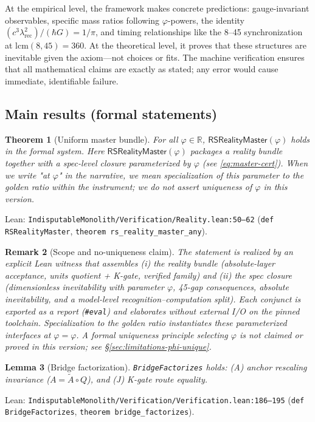 \documentclass[11pt,a4paper,twoside]{article}
\numberwithin{equation}{section}
\newcommand{\phigr}{\varphi} %
\theoremstyle{customthm}
\newtheorem{theorem}{Theorem}[section]
\newtheorem{lemma}[theorem]{Lemma}
\theoremstyle{customdef}
\theoremstyle{customrem}
\newtheorem{remark}[theorem]{Remark}
\begin{document}
At the empirical level, the framework makes concrete predictions: gauge-invariant observables, specific mass ratios following $\varphi$-powers, the identity $(c^3\lambda_{\mathrm{rec}}^2)/(\hbar G) = 1/\pi$, and timing relationships like the 8--45 synchronization at lcm$(8,45)=360$. At the theoretical level, it proves that these structures are inevitable given the axiom—not choices or fits. The machine verification ensures that all mathematical claims are exactly as stated; any error would cause immediate, identifiable failure.

\subsection{Main results (formal statements)}

\begin{theorem}[Uniform master bundle]\label{thm:master}
For all $\varphi\in\mathbb{R}$, \(\mathsf{RSRealityMaster}(\varphi)\) holds in the formal system. Here $\mathsf{RSRealityMaster}(\varphi)$ packages a reality bundle together with a spec-level closure parameterized by $\varphi$ (see \eqref{eq:master-cert}). When we write "at $\varphi$" in the narrative, we mean specialization of this parameter to the golden ratio within the instrument; we do not assert uniqueness of $\varphi$ in this version.
\end{theorem}
\noindent Lean: \texttt{IndisputableMonolith/Verification/Reality.lean:50--62} (\texttt{def RSRealityMaster}, \texttt{theorem rs\_reality\_master\_any}).

\begin{remark}[Scope and no-uniqueness claim]
The statement is realized by an explicit Lean witness that assembles (i) the reality bundle (absolute-layer acceptance, units quotient + K-gate, verified family) and (ii) the spec closure (dimensionless inevitability with parameter $\varphi$, 45-gap consequences, absolute inevitability, and a model-level recognition–computation split). Each conjunct is exported as a report (\texttt{\#eval}) and elaborates without external I/O on the pinned toolchain. Specialization to the golden ratio instantiates these parameterized interfaces at $\varphi=\phigr$. A formal uniqueness principle selecting $\phigr$ is not claimed or proved in this version; see \S\ref{sec:limitations-phi-unique}.
\end{remark}

\begin{lemma}[Bridge factorization]\label{lem:factorizes}
\texttt{BridgeFactorizes} holds: (A) anchor rescaling invariance (\(A=\tilde A\circ Q\)), and (J) K-gate route equality.
\end{lemma}
\noindent Lean: \texttt{IndisputableMonolith/Verification/Verification.lean:186--195} (\texttt{def BridgeFactorizes}, \texttt{theorem bridge\_factorizes}).
\end{document}
